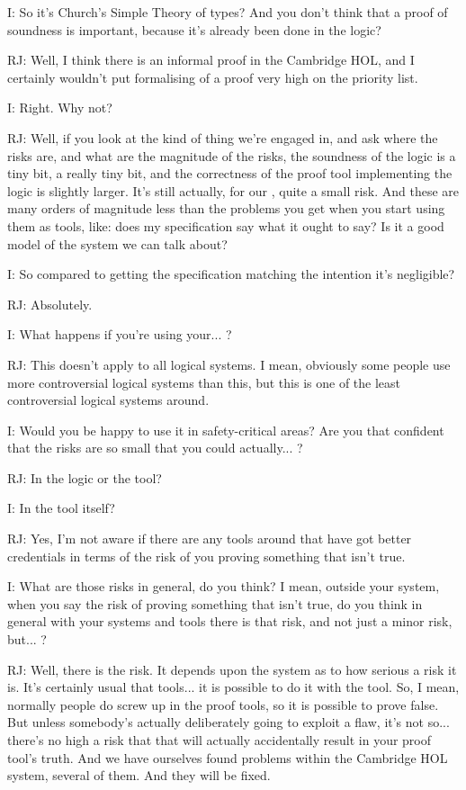 \documentclass[10pt,titlepage]{book}
\begin{document}
I: So it's Church's Simple Theory of types? And you don't think that a proof of soundness is important, because it's already been done in the logic?

RJ: Well, I think there is an informal proof in the Cambridge HOL, and I certainly wouldn't put formalising of a proof very high on the priority list.

I: Right. Why not?

RJ: Well, if you look at the kind of thing we're engaged in, and ask where the risks are, and what are the magnitude of the risks, the soundness of the logic is a tiny bit, a really tiny bit, and the correctness of the proof tool implementing the logic is slightly larger. It's still actually, for our	, quite a small risk. And these are many orders of magnitude less than the problems you get when you start using them as tools, like: does my specification say what it ought to say? Is it a good model of the system we can talk about?

I: So compared to getting the specification matching the intention it's negligible?

RJ: Absolutely.

I: What happens if you're using your... ?

RJ: This doesn't apply to all logical systems. I mean, obviously some people use more controversial logical systems than this, but this is one of the least controversial logical systems around.

I: Would you be happy to use it in safety-critical areas? Are you that confident that the risks are so small that you could actually... ?

RJ: In the logic or the tool?

I: In the tool itself?

RJ: Yes, I'm not aware if there are any tools around that have got better credentials in terms of the risk of you proving something that isn't true.

I: What are those risks in general, do you think? I mean, outside your system, when you say the risk of proving something that isn't true, do you think in general with your systems and tools there is that risk, and not just a minor risk, but... ?

RJ: Well, there is the risk. It depends upon the system as to how serious a risk it is. It's certainly usual that tools... it is possible to do it with the tool. So, I mean, normally people do screw up in the proof tools, so it is possible to prove false. But unless somebody's actually deliberately going to exploit a flaw, it's not so... there's no high a risk that that will actually accidentally result in your proof tool's truth. And we have ourselves found problems within the Cambridge HOL system, several of them. And they will be fixed.
\end{document}
